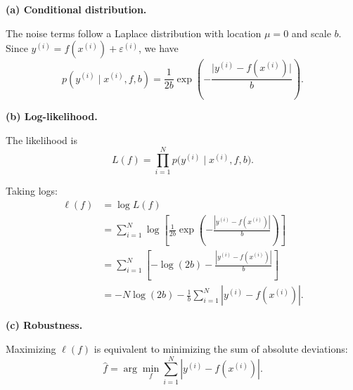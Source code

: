 \documentclass{article}
\begin{document}
	\textbf{(a) Conditional distribution.}

	The noise terms follow a Laplace distribution with location $\mu = 0$ and scale $b$.
	Since $y^{(i)} = f(x^{(i)}) + \varepsilon^{(i)}$, we have
	\[
		p(y^{(i)} \mid x^{(i)}, f, b)
		= \frac{1}{2b} \exp\!\left(
		-\frac{\big|y^{(i)} - f(x^{(i)})\big|}{b}
		\right).
	\]

	\textbf{(b) Log-likelihood.}

	The likelihood is
	\[
		L(f) = \prod_{i=1}^N p\!\big(y^{(i)} \mid x^{(i)}, f, b\big).
	\]

	Taking logs:
	\begin{align*}
		\ell(f) & = \log L(f)                                                     \\
		        & = \sum_{i=1}^N \log \left[
		\frac{1}{2b} \exp\!\left(
		-\frac{|y^{(i)} - f(x^{(i)})|}{b}
		\right)
		\right]                                                                   \\
		        & = \sum_{i=1}^N \left[
		-\log(2b) - \frac{|y^{(i)} - f(x^{(i)})|}{b}
		\right]                                                                   \\
		        & = -N \log(2b) - \frac{1}{b}\sum_{i=1}^N |y^{(i)} - f(x^{(i)})|.
	\end{align*}

	\textbf{(c) Robustness.}

	Maximizing $\ell(f)$ is equivalent to minimizing the sum of absolute deviations:
	\[
		\hat f = \arg\min_f \sum_{i=1}^N |y^{(i)} - f(x^{(i)})|.
	\]
\end{document}
